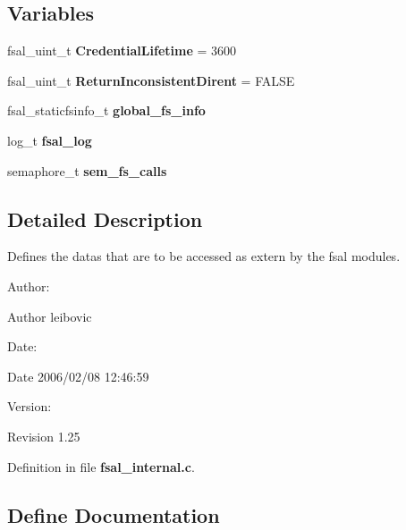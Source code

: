 \subsection*{Variables}
\begin{CompactItemize}
\item 
fsal\_\-uint\_\-t {\bf Credential\-Lifetime} = 3600\label{fsal__internal_8c_a4}

\item 
fsal\_\-uint\_\-t {\bf Return\-Inconsistent\-Dirent} = FALSE\label{fsal__internal_8c_a5}

\item 
fsal\_\-staticfsinfo\_\-t {\bf global\_\-fs\_\-info}\label{fsal__internal_8c_a6}

\item 
log\_\-t {\bf fsal\_\-log}\label{fsal__internal_8c_a8}

\item 
semaphore\_\-t {\bf sem\_\-fs\_\-calls}\label{fsal__internal_8c_a10}

\end{CompactItemize}


\subsection{Detailed Description}
Defines the datas that are to be accessed as extern by the fsal modules. 

\begin{Desc}
\item[Author:]\begin{Desc}
\item[Author]leibovic \end{Desc}
\end{Desc}
\begin{Desc}
\item[Date:]\begin{Desc}
\item[Date]2006/02/08 12:46:59 \end{Desc}
\end{Desc}
\begin{Desc}
\item[Version:]\begin{Desc}
\item[Revision]1.25 \end{Desc}
\end{Desc}


Definition in file {\bf fsal\_\-internal.c}.

\subsection{Define Documentation}
